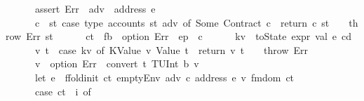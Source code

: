 \begin{isabellebody}
\ \ \ \ \ \ assert\ Err\ {\isacharparenleft}{\kern0pt}{\isasymlambda}{\isacharunderscore}{\kern0pt}{\isachardot}{\kern0pt}\ adv\ {\isasymnoteq}\ address\ e{\isacharparenright}{\kern0pt}{\isacharsemicolon}{\kern0pt}\isanewline
\ \ \ \ \ \ c\ {\isasymleftarrow}\ {\isacharparenleft}{\kern0pt}{\isasymlambda}st{\isachardot}{\kern0pt}\ case\ type\ {\isacharparenleft}{\kern0pt}accounts\ st\ adv{\isacharparenright}{\kern0pt}\ of\ Some\ {\isacharparenleft}{\kern0pt}Contract\ c{\isacharparenright}{\kern0pt}\ {\isasymRightarrow}\ return\ c\ st\ {\isacharbar}{\kern0pt}\ {\isacharunderscore}{\kern0pt}\ {\isasymRightarrow}\ throw\ Err\ st{\isacharparenright}{\kern0pt}{\isacharsemicolon}{\kern0pt}\isanewline
\ \ \ \ \ \ {\isacharparenleft}{\kern0pt}ct{\isacharcomma}{\kern0pt}\ {\isacharunderscore}{\kern0pt}{\isacharcomma}{\kern0pt}\ fb{\isacharparenright}{\kern0pt}\ {\isasymleftarrow}\ option\ Err\ {\isacharparenleft}{\kern0pt}{\isasymlambda}{\isacharunderscore}{\kern0pt}{\isachardot}{\kern0pt}\ ep\ {\isachardollar}{\kern0pt}{\isachardollar}{\kern0pt}\ c{\isacharparenright}{\kern0pt}{\isacharsemicolon}{\kern0pt}\isanewline
\ \ \ \ \ \ kv\ {\isasymleftarrow}\ toState\ {\isacharparenleft}{\kern0pt}expr\ val\ e\ cd{\isacharparenright}{\kern0pt}{\isacharsemicolon}{\kern0pt}\isanewline
\ \ \ \ \ \ {\isacharparenleft}{\kern0pt}v{\isacharcomma}{\kern0pt}\ t{\isacharparenright}{\kern0pt}\ {\isasymleftarrow}\ case\ kv\ of\ {\isacharparenleft}{\kern0pt}KValue\ v{\isacharcomma}{\kern0pt}\ Value\ t{\isacharparenright}{\kern0pt}\ {\isasymRightarrow}\ return\ {\isacharparenleft}{\kern0pt}v{\isacharcomma}{\kern0pt}\ t{\isacharparenright}{\kern0pt}\ {\isacharbar}{\kern0pt}\ {\isacharunderscore}{\kern0pt}\ {\isasymRightarrow}\ throw\ Err{\isacharsemicolon}{\kern0pt}\isanewline
\ \ \ \ \ \ v{\isacharprime}{\kern0pt}\ {\isasymleftarrow}\ option\ Err\ {\isacharparenleft}{\kern0pt}{\isasymlambda}{\isacharunderscore}{\kern0pt}{\isachardot}{\kern0pt}\ convert\ t\ {\isacharparenleft}{\kern0pt}TUInt\ b{}{}{}{\isacharparenright}{\kern0pt}\ v{\isacharparenright}{\kern0pt}{\isacharsemicolon}{\kern0pt}\isanewline
\ \ \ \ \ \ let\ e{\isacharprime}{\kern0pt}\ {\isacharequal}{\kern0pt}\ ffold{\isacharunderscore}{\kern0pt}init\ ct\ {\isacharparenleft}{\kern0pt}emptyEnv\ adv\ c\ {\isacharparenleft}{\kern0pt}address\ e{\isacharparenright}{\kern0pt}\ v{\isacharprime}{\kern0pt}{\isacharparenright}{\kern0pt}\ {\isacharparenleft}{\kern0pt}fmdom\ ct{\isacharparenright}{\kern0pt}{\isacharsemicolon}{\kern0pt}\isanewline
\ \ \ \ \ \ case\ ct\ {\isachardollar}{\kern0pt}{\isachardollar}{\kern0pt}\ i\ of\isanewline

\end{isabellebody}
